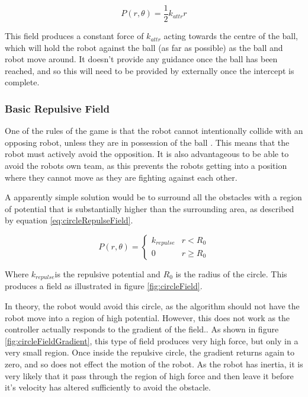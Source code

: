 \documentclass[10pt]{article} \usepackage[a4paper]{geometry}
\begin{document}
\begin{equation}
P(r,\theta)=\frac{1}{2}k_{attr}r\label{eq:conicBallField}
\end{equation}

This field produces a constant force of $k_{attr}$ acting towards the centre of
the ball, which will hold the robot against the ball (as far as possible) as the
ball and robot move around. It doesn't provide any guidance once the ball has
been reached, and so this will need to be provided by externally once
the intercept is complete.

\subsubsection{Basic Repulsive Field\label{sub:Basic-Repulsive-Field}}

One of the rules of the game is that the robot cannot intentionally collide with
an opposing robot, unless they are in possession of the ball
\cite{simurosotSim}. This means that the robot must actively avoid the
opposition. It is also advantageous to be able to avoid the robots own team, as
this prevents the robots getting into a position where they cannot move as they
are fighting against each other.

A apparently simple solution would be to surround all the obstacles with a
region of potential that is substantially higher than the surrounding area, as
described by equation \ref{eq:circleRepulseField}.

\begin{equation}
P\left(r,\theta\right)=\begin{cases}
k_{repulse} & r<R_{0}\\
0 & r\geq R_{0}
\end{cases}\label{eq:circleRepulseField}
\end{equation}

Where $k_{repulse}$is the repulsive potential and $R_{0}$ is the radius of the
circle. This produces a field as illustrated in figure \ref{fig:circleField}.

In theory, the robot would avoid this circle, as the algorithm should not have
the robot move into a region of high potential. However, this does not work as
the controller actually responds to the gradient of the field.. As shown in
figure \ref{fig:circleFieldGradient}, this type of field produces very high
force, but only in a very small region. Once inside the repulsive circle, the
gradient returns again to zero, and so does not effect the motion of the robot.
As the robot has inertia, it is very likely that it pass through the region of
high force and then leave it before it's velocity has altered sufficiently to
avoid the obstacle.
\end{document}

